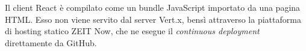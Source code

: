     Il client React è compilato come un bundle JavaScript importato da una pagina HTML\@.
    Esso non viene servito dal server Vert.x, bensì attraverso la piattaforma di hosting statico ZEIT Now, che ne esegue il \emph{continuous deployment} direttamente da GitHub.




